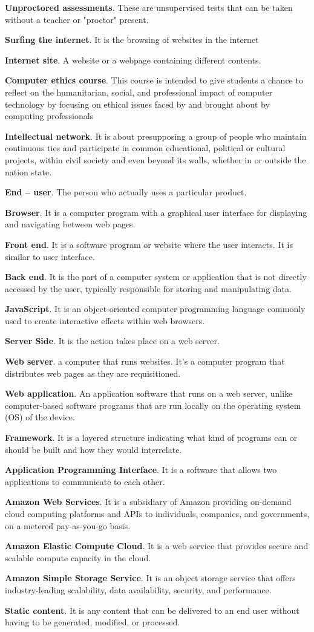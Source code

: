 \textbf{Unproctored assessments}.
These are unsupervised tests that can be taken without a teacher or "proctor" present.

\textbf{Surfing the internet}.
It is the browsing of websites in the internet

\textbf{Internet site}.
A website or a webpage containing different contents.

\textbf{Computer ethics course}.
This course is intended to give students a chance to reflect on the humanitarian, social, and professional impact of computer technology by focusing on ethical issues faced by and brought about by computing professionals

\textbf{Intellectual network}.
It is about presupposing a group of people who maintain continuous ties and participate in common educational, political or cultural projects, within civil society and even beyond its walls, whether in or outside the nation state.

\textbf{End – user}.
The person who actually uses a particular product.

\textbf{Browser}.
It is a computer program with a graphical user interface for displaying and navigating between web pages.

\textbf{Front end}.
It is a software program or website where the user interacts. It is similar to user interface.

\textbf{Back end}.
It is the part of a computer system or application that is not directly accessed by the user, typically responsible for storing and manipulating data.

\textbf{JavaScript}.
It is an object-oriented computer programming language commonly used to create interactive effects within web browsers.

\textbf{Server Side}.
It is the action takes place on a web server.

\textbf{Web server}.
a computer that runs websites. It's a computer program that distributes web pages as they are requisitioned.

\textbf{Web application}.
An application software that runs on a web server, unlike computer-based software programs that are run locally on the operating system (OS) of the device.

\textbf{Framework}.
It is a layered structure indicating what kind of programs can or should be built and how they would interrelate.

\textbf{Application Programming Interface}.
It is a software that allows two applications to communicate to each other.

\textbf{Amazon Web Services}.
It is a subsidiary of Amazon providing on-demand cloud computing platforms and APIs to individuals, companies, and governments, on a metered pay-as-you-go basis.

\textbf{Amazon Elastic Compute Cloud}.
It is a web service that provides secure and scalable compute capacity in the cloud.

\textbf{Amazon Simple Storage Service}.
It is an object storage service that offers industry-leading scalability, data availability, security, and performance.

\textbf{Static content}.
It is any content that can be delivered to an end user without having to be generated, modified, or processed.
